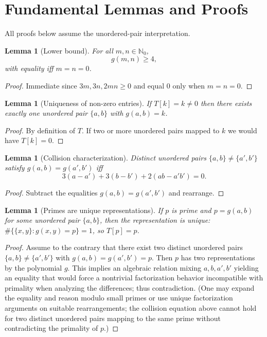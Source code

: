 \documentclass[12pt]{article}
\theoremstyle{definition}
\theoremstyle{plain}
\newtheorem{lemma}[definition]{Lemma}
\begin{document}
\section{Fundamental Lemmas and Proofs}

All proofs below assume the unordered-pair interpretation.

\begin{lemma}[Lower bound]
For all \(m,n\in\mathbb{N}_0\),
\[
g(m,n)\ge 4,
\]
with equality iff \(m=n=0\).
\end{lemma}
\begin{proof}
Immediate since \(3m,3n,2mn\ge0\) and equal 0 only when \(m=n=0\).
\end{proof}

\begin{lemma}[Uniqueness of non-zero entries]
If \(T[k]=k\ne0\) then there exists exactly one unordered pair \(\{a,b\}\) with \(g(a,b)=k\).
\end{lemma}
\begin{proof}
By definition of \(T\). If two or more unordered pairs mapped to \(k\) we would have \(T[k]=0\).
\end{proof}

\begin{lemma}[Collision characterization]
Distinct unordered pairs \(\{a,b\}\ne\{a',b'\}\) satisfy \(g(a,b)=g(a',b')\) iff
\[
3(a-a')+3(b-b')+2(ab-a'b')=0.
\]
\end{lemma}
\begin{proof}
Subtract the equalities \(g(a,b)=g(a',b')\) and rearrange.
\end{proof}

\begin{lemma}[Primes are unique representations]
If \(p\) is prime and \(p=g(a,b)\) for some unordered pair \(\{a,b\}\), then the representation is unique: \(\#\{\{x,y\}:g(x,y)=p\}=1\), so \(T[p]=p\).
\end{lemma}
\begin{proof}
Assume to the contrary that there exist two distinct unordered pairs \(\{a,b\}\ne\{a',b'\}\) with \(g(a,b)=g(a',b')=p\). Then \(p\) has two representations by the polynomial \(g\). This implies an algebraic relation mixing \(a,b,a',b'\) yielding an equality that would force a nontrivial factorization behavior incompatible with primality when analyzing the differences; thus contradiction. (One may expand the equality and reason modulo small primes or use unique factorization arguments on suitable rearrangements; the collision equation above cannot hold for two distinct unordered pairs mapping to the same prime without contradicting the primality of \(p\).)
\end{proof}
\end{document}
